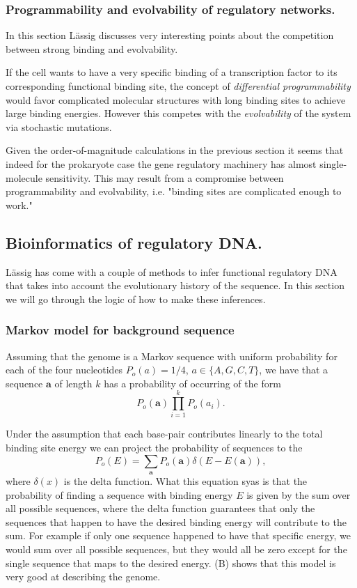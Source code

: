 \subsubsection{Programmability and evolvability of regulatory networks.}
In this section L\"{a}ssig discusses very interesting points about the competition
between strong binding and evolvability.

If the cell wants to have a very specific binding of a transcription factor to
its corresponding functional binding site, the concept of {\it differential
programmability} would favor complicated molecular structures with long binding
sites to achieve large binding energies. However this competes with the {\it
evolvability} of the system via stochastic mutations.

Given the order-of-magnitude calculations in the previous section it seems that
indeed for the prokaryote case the gene regulatory machinery has almost single-
molecule sensitivity. This may result from a compromise between programmability
and evolvability, i.e. "binding sites are complicated enough to work."

\subsection{Bioinformatics of regulatory DNA.}
L\"{a}ssig has come with a couple of methods to infer functional regulatory DNA that
takes into account the evolutionary history of the sequence. In this section we
will go through the logic of how to make these inferences.

\subsubsection{Markov model for background sequence}

Assuming that the genome is a Markov sequence with uniform probability for each
of the four nucleotides $P_o(a) = 1/4$, $a \in \{A, G, C, T \}$, we have that a
sequence $\mathbf{a}$ of length $k$ has a probability of occurring of the form
\begin{equation}
  P_o(\mathbf{a}) \prod_{i=1}^k P_o(a_i).
\end{equation}

Under the assumption that each base-pair contributes linearly to the total
binding site energy we can project the probability of sequences to the
\begin{equation}
  P_o(E) = \sum_{\mathbf{a}} P_o(\mathbf{a}) \delta(E - E(\mathbf{a})),
\end{equation}
where $\delta(x)$ is the delta function. What this equation syas is that the
probability of finding a sequence with binding energy $E$ is given by the sum
over all possible sequences, where the delta function guarantees that only the
sequences that happen to have the desired binding energy will contribute to the
sum. For example if only one sequence happened to have that specific energy, we
would sum over all possible sequences, but they would all be zero except for the
single sequence that maps to the desired energy. (B)
shows that this model is very good at describing the genome.


